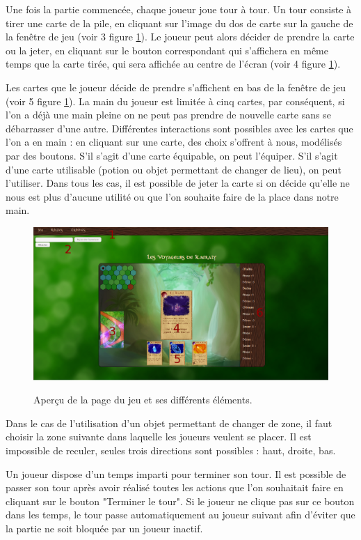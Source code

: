 \documentclass[12pt]{report}
\begin{document}
    Une fois la partie commencée, chaque joueur joue tour à tour. Un tour consiste à tirer une carte de la pile, en cliquant sur l'image du dos de carte sur la gauche de la fenêtre de jeu (voir 3 figure \ref{fig:manual}). Le joueur peut alors décider de prendre la carte ou la jeter, en cliquant sur le bouton correspondant qui s'affichera en même temps que la carte tirée, qui sera affichée au centre de l'écran (voir 4 figure \ref{fig:manual}).

    Les cartes que le joueur décide de prendre s'affichent en bas de la fenêtre de jeu (voir 5 figure \ref{fig:manual}). La main du joueur est limitée à cinq cartes, par conséquent, si l'on a déjà une main pleine on ne peut pas prendre de nouvelle carte sans se débarrasser d'une autre. Différentes interactions sont possibles avec les cartes que l'on a en main : en cliquant sur une carte, des choix s'offrent à nous, modélisés par des boutons. S'il s'agit d'une carte équipable, on peut l'équiper. S'il s'agit d'une carte utilisable (potion ou objet permettant de changer de lieu), on peut l'utiliser. Dans tous les cas, il est possible de jeter la carte si on décide qu'elle ne nous est plus d'aucune utilité ou que l'on souhaite faire de la place dans notre main.

	\begin{figure}[h!]
		\centering
		\includegraphics[scale=0.35]{manual}
		\label{fig:manual}
		\caption{Aperçu de la page du jeu et ses différents éléments.}
	\end{figure}

    Dans le cas de l'utilisation d'un objet permettant de changer de zone, il faut choisir la zone suivante dans laquelle les joueurs veulent se placer. Il est impossible de reculer, seules trois directions sont possibles : haut, droite, bas.

    Un joueur dispose d'un temps imparti pour terminer son tour. Il est possible de passer son tour après avoir réalisé toutes les actions que l'on souhaitait faire en cliquant sur le bouton "Terminer le tour". Si le joueur ne clique pas sur ce bouton dans les temps, le tour passe automatiquement au joueur suivant afin d'éviter que la partie ne soit bloquée par un joueur inactif.
\end{document}
